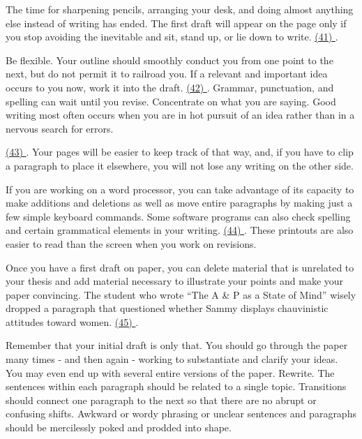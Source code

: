 
\qquad The time for sharpening pencils, arranging your desk, and doing almost anything else instead of writing has ended. The first draft will appear on the page only if you stop avoiding the inevitable and sit, stand up, or lie down to write. \ul{(41) \qquad\qquad}.

\qquad Be flexible. Your outline should smoothly conduct you from one point to the next, but do not permit it to railroad you. If a relevant and important idea occurs to you now, work it into the draft. \ul{(42) \qquad\qquad}. Grammar, punctuation, and spelling can wait until you revise. Concentrate on what you are saying. Good writing most often occurs when you are in hot pursuit of an idea rather than in a nervous search for errors.

\qquad \ul{(43) \qquad\qquad}. Your pages will be easier to keep track of that way, and, if you have to clip a paragraph to place it elsewhere, you will not lose any writing on the other side.

\qquad If you are working on a word processor, you can take advantage of its capacity to make additions and deletions as well as move entire paragraphs by making just a few simple keyboard commands. Some software programs can also check spelling and certain grammatical elements in your writing. \ul{(44) \qquad\qquad}. These printouts are also easier to read than the screen when you work on revisions.

\qquad Once you have a first draft on paper, you can delete material that is unrelated to your thesis and add material necessary to illustrate your points and make your paper convincing. The student who wrote ``The A \& P as a State of Mind'' wisely dropped a paragraph that questioned whether Sammy displays chauvinistic attitudes toward women. \ul{(45) \qquad\qquad}.

\qquad Remember that your initial draft is only that. You should go through the paper many times - and then again - working to substantiate and clarify your ideas. You may even end up with several entire versions of the paper. Rewrite. The sentences within each paragraph should be related to a single topic. Transitions should connect one paragraph to the next so that there are no abrupt or confusing shifts. Awkward or wordy phrasing or unclear sentences and paragraphs should be mercilessly poked and prodded into shape.

\vspace{6pt}


